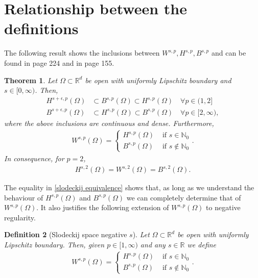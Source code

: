 \documentclass[
    a4paper,
    DIV=14,
    abstract=true,
    numbers=noenddot
]
{scrartcl}
\newtheorem{theorem}{Theorem}[section]
\newtheorem{definition}[theorem]{Definition}
\theoremstyle{definition}
\newcommand{\N}{\mathbb{N}}
\newcommand{\R}{\mathbb{R}}
\begin{document}
\section{Relationship between the definitions}
The following result shows the inclusions between $W^{s,p},H^{s,p},B^{s,p}$ and can be found in \cite{agranovich2015sobolev} page 224 and in \cite{stein1970singular} page 155.
\begin{theorem}\label{equivalence fractional spaces}
    Let $\Omega \subset \R^d$ be open with uniformly Lipschitz boundary and $s \in [0,\infty)$. Then,
    \begin{align*}
        H^{s+\epsilon,p}(\Omega ) & \subset B^{s,p}(\Omega )  \subset H^{s,p}(\Omega )\quad \forall p \in (1,2]       \\
        B^{s+\epsilon,p}(\Omega ) & \subset H^{s,p}(\Omega )  \subset B^{s,p}(\Omega )\quad \forall p \in [2,\infty),
    \end{align*}
    where the above inclusions are continuous and dense. Furthermore,
    \begin{align}\label{slodeckij equivalence}
        W^{s,p}(\Omega )= \begin{cases}
                              H^{s,p}(\Omega ) & \text{ if } s \in \N_0    \\
                              B^{s,p}(\Omega ) & \text{ if } s \notin \N_0
                          \end{cases}.
    \end{align}
    In consequence, for $p=2$,
    \begin{align}\label{p=2}
        H^{s,2}(\Omega )=W^{s,2}(\Omega )=B^{s,2}(\Omega ).
    \end{align}
\end{theorem}
The equality in \eqref{slodeckij equivalence} shows that, as long as we understand the behaviour of $H^{s,p}(\Omega )$ and $B^{s,p}(\Omega )$ we can completely determine that of $W^{s,p}(\Omega )$. It also justifies the following extension of $W^{s,p}(\Omega )$ to negative regularity.
\begin{definition}[Slodeckij space negative $s$]\label{negative s slodeckij}
    Let $\Omega \subset \R^d$ be open with uniformly Lipschitz boundary. Then, given $p \in [1,\infty)$ and any  $s \in \R$ we define
    \begin{align*}
        W^{s,p}(\Omega )= \begin{cases}
                              H^{s,p}(\Omega ) & \text{ if } s \in \N_0    \\
                              B^{s,p}(\Omega ) & \text{ if } s \notin \N_0
                          \end{cases}.
    \end{align*}
\end{definition}
\end{document}
